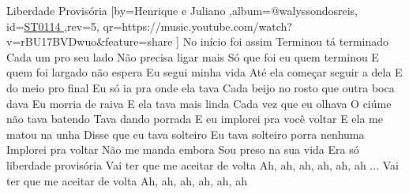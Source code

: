 \beginsong
{Liberdade Provisória %
}[by={Henrique e Juliano %
},album={@walyssondosreis},
id={\href{https://music.youtube.com/watch?v=rBU17BVDwuo&feature=share %
}{ST0114 %
}},rev={5}, %
qr={https://music.youtube.com/watch?v=rBU17BVDwuo&feature=share %
}]
\beginverse
No início foi assim
Terminou tá terminado
Cada um pro seu lado
Não precisa ligar mais
\endverse
\beginverse
Só que foi eu quem terminou
E quem foi largado não espera
Eu segui minha vida
Até ela começar seguir a dela
\endverse
\beginverse
E do meio pro final
Eu só ia pra onde ela tava
Cada beijo no rosto que outra boca dava
Eu morria de raiva
\endverse
\beginverse
E ela tava mais linda
Cada vez que eu olhava
O ciúme não tava batendo
Tava dando porrada
\endverse
\beginchorus
E eu implorei pra você voltar
E ela me matou na unha
Disse que eu tava solteiro
Eu tava solteiro porra nenhuma
Implorei pra voltar
Não me manda embora
Sou preso na sua vida
Era só liberdade provisória
Vai ter que me aceitar de volta
Ah, ah, ah, ah, ah, ah
\endchorus
{}
\beginverse
... Vai ter que me aceitar de volta
Ah, ah, ah, ah, ah, ah
\endverse
\vspace{4em} %
\begin{comment}
\lstset{basicstyle=\scriptsize\bf} %
\tab{Solo 1}
\begin{lstlisting}
E|-----------------------------------------------------|
B|-----------------------------------------------------|
G|-----------------------------------------------------|
D|-----------------------------------------------------|
A|-----------------------------------------------------|
E|-----------------------------------------------------|
\end{lstlisting}
\end{comment}
